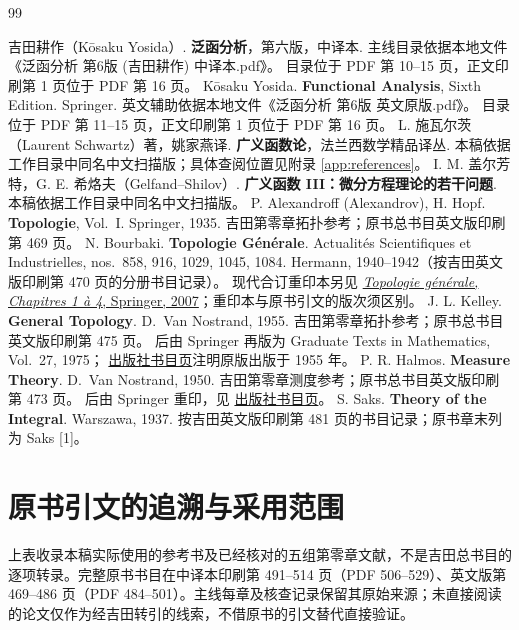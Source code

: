\begin{thebibliography}{99}
 吉田耕作（K\={o}saku Yosida）.
\textbf{泛函分析}，第六版，中译本.
主线目录依据本地文件《泛函分析 第6版 (吉田耕作) 中译本.pdf》。
目录位于 PDF 第 10--15 页，正文印刷第 1 页位于 PDF 第 16 页。
 K\={o}saku Yosida.
\textbf{Functional Analysis}, Sixth Edition. Springer.
英文辅助依据本地文件《泛函分析 第6版 英文原版.pdf》。
目录位于 PDF 第 11--15 页，正文印刷第 1 页位于 PDF 第 16 页。
 L. 施瓦尔茨（Laurent Schwartz）著，姚家燕译.
\textbf{广义函数论}，法兰西数学精品译丛.
本稿依据工作目录中同名中文扫描版；具体查阅位置见附录 \ref{app:references}。
 I. M. 盖尔芳特，G. E. 希烙夫（Gelfand--Shilov）.
\textbf{广义函数 III：微分方程理论的若干问题}.
本稿依据工作目录中同名中文扫描版。
 P. Alexandroff (Alexandrov), H. Hopf.
\textbf{Topologie}, Vol.~I. Springer, 1935.
吉田第零章拓扑参考；原书总书目英文版印刷第 469 页。
 N. Bourbaki.
\textbf{Topologie G\'en\'erale}.
Actualit\'es Scientifiques et Industrielles, nos.~858, 916, 1029, 1045, 1084.
Hermann, 1940--1942（按吉田英文版印刷第 470 页的分册书目记录）。
现代合订重印本另见 \href{https://link.springer.com/book/10.1007/978-3-540-33982-3}{\emph{Topologie g\'en\'erale, Chapitres 1 \`a 4}, Springer, 2007}；重印本与原书引文的版次须区别。
 J. L. Kelley.
\textbf{General Topology}. D.~Van Nostrand, 1955.
吉田第零章拓扑参考；原书总书目英文版印刷第 475 页。
后由 Springer 再版为 Graduate Texts in Mathematics, Vol.~27, 1975；
\href{https://link.springer.com/book/9780387901251}{出版社书目页}注明原版出版于 1955 年。
 P. R. Halmos.
\textbf{Measure Theory}. D.~Van Nostrand, 1950.
吉田第零章测度参考；原书总书目英文版印刷第 473 页。
后由 Springer 重印，见 \href{https://link.springer.com/book/10.1007/978-1-4684-9440-2}{出版社书目页}。
 S. Saks.
\textbf{Theory of the Integral}. Warszawa, 1937.
按吉田英文版印刷第 481 页的书目记录；原书章末列为 Saks [1]。
\end{thebibliography}
\section*{原书引文的追溯与采用范围}
上表收录本稿实际使用的参考书及已经核对的五组第零章文献，不是吉田总书目的逐项转录。完整原书书目在中译本印刷第 491--514 页（PDF 506--529）、英文版第 469--486 页（PDF 484--501）。主线每章及核查记录保留其原始来源；未直接阅读的论文仅作为经吉田转引的线索，不借原书的引文替代直接验证。

